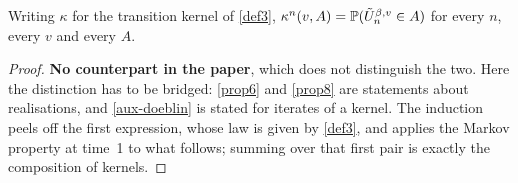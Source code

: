 \begin{lemma}
  \label{aux-nstep}
  \leanok
  Writing $\kappa$ for the transition kernel of \ref{def3},
  $\kappa^n(v, A) = \mathbb{P}(\tilde{U}^{\beta,v}_n \in A)$ for every $n$, every $v$ and
  every $A$.
\end{lemma}
\begin{proof}
  \leanok
  \textbf{No counterpart in the paper}, which does not distinguish the two.
  Here the distinction has to be bridged: \ref{prop6} and \ref{prop8} are
  statements about realisations, and \ref{aux-doeblin} is stated for iterates
  of a kernel.  The induction peels off the first expression, whose law is
  given by \ref{def3}, and applies the Markov property at time~1 to what
  follows; summing over that first pair is exactly the composition of kernels.
\end{proof}

